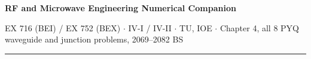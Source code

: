 \documentclass[10pt]{article}
\begin{document}
{\LARGE\bfseries RF and Microwave Engineering \gap\textcolor{sub}{Numerical Companion}}\par
{\footnotesize\color{sub} EX 716 (BEI) / EX 752 (BEX) $\cdot$ IV-I / IV-II $\cdot$ TU, IOE
$\cdot$ Chapter 4, all 8 PYQ waveguide and junction problems, 2069--2082 BS}
\vspace{3pt}\hrule\vspace{4pt}

\setcounter{section}{3}



\end{document}
